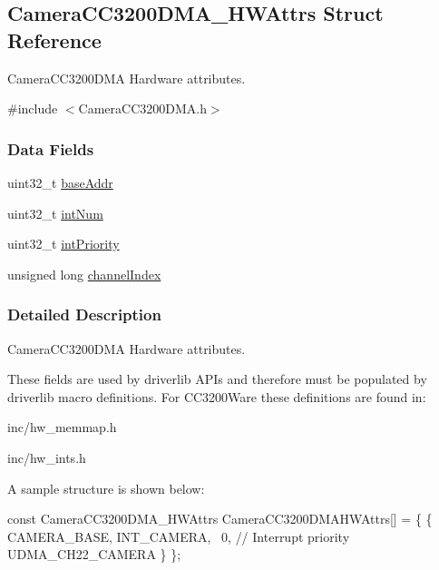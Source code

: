 \subsection{Camera\+C\+C3200\+D\+M\+A\+\_\+\+H\+W\+Attrs Struct Reference}
\label{struct_camera_c_c3200_d_m_a___h_w_attrs}


Camera\+C\+C3200\+D\+M\+A Hardware attributes.  




{\ttfamily \#include $<$Camera\+C\+C3200\+D\+M\+A.\+h$>$}

\subsubsection*{Data Fields}
\begin{DoxyCompactItemize}
\item 
uint32\+\_\+t \hyperlink{struct_camera_c_c3200_d_m_a___h_w_attrs_acfa7bb614d325041585520abc4070e92}{base\+Addr}
\item 
uint32\+\_\+t \hyperlink{struct_camera_c_c3200_d_m_a___h_w_attrs_ac87823c26e765b7e830b003d2873450c}{int\+Num}
\item 
uint32\+\_\+t \hyperlink{struct_camera_c_c3200_d_m_a___h_w_attrs_a734b7a176507e123d43627c12e0c1d35}{int\+Priority}
\item 
unsigned long \hyperlink{struct_camera_c_c3200_d_m_a___h_w_attrs_ae26fea6bcda14af807d5ae1a080ba706}{channel\+Index}
\end{DoxyCompactItemize}


\subsubsection{Detailed Description}
Camera\+C\+C3200\+D\+M\+A Hardware attributes. 

These fields are used by driverlib A\+P\+Is and therefore must be populated by driverlib macro definitions. For C\+C3200\+Ware these definitions are found in\+:
\begin{DoxyItemize}
\item inc/hw\+\_\+memmap.\+h
\item inc/hw\+\_\+ints.\+h
\end{DoxyItemize}

A sample structure is shown below\+: 
\begin{DoxyCode}
\textcolor{keyword}{const} CameraCC3200DMA_HWAttrs CameraCC3200DMAHWAttrs[] = \{
    \{
        CAMERA\_BASE,
        INT\_CAMERA,
        ~0,                   \textcolor{comment}{// Interrupt priority}
        UDMA\_CH22\_CAMERA
    \}
\};
\end{DoxyCode}
 

